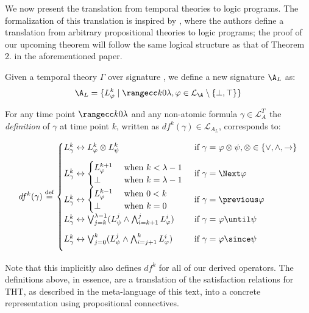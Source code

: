 We now present the translation from temporal theories to logic
programs. The formalization of this translation is inspired by
\cite[p. 9]{capeva05a}, where the authors define a translation from
arbitrary propositional theories to logic programs; the proof of our
upcoming theorem will follow the same logical structure as that of
Theorem 2. in the aforementioned paper.


Given a temporal theory $\Gamma$ over signature \A, we
define a new signature $\A_L$ as:
$$
\A_L = \{ L_{\varphi}^k \mid \kinlambda, \varphi \in
\mathcal{L}_\A\setminus \{ \bot, \top \} \}
$$

For any time point $\kinlambda$ and any non-atomic formula $\gamma \in \mathcal{L}_A^T$ the \emph{definition} of $\gamma$ at time point $k$, written as $df^k(\gamma) \in \mathcal{L}_{A_L}$, corresponds to:

\begin{align*}
df^k(\gamma) \defeq \begin{cases}
  L^k_{\gamma} \leftrightarrow L_{\varphi}^k \otimes L_{\psi}^k 
  &\text{ if } \gamma = \varphi \otimes \psi, \otimes \in \{ \vee, \wedge, \rightarrow \}\\[2ex]
  L^k_\gamma \leftrightarrow \begin{cases} 
    L^{k+1}_{\varphi} &\text{ when } k < \lambda - 1\\
    \bot &\text{ when } k = \lambda - 1
    \end{cases}
  &\text{ if } \gamma = \Next \varphi \\[2ex]
  L^k_{\gamma} \leftrightarrow \begin{cases} 
    L^{k-1}_{\varphi} &\text{ when } 0 < k\\
    \bot &\text{ when } k = 0
    \end{cases}
  &\text{ if } \gamma = \previous \varphi \\[2ex]
  L^k_{\gamma} \leftrightarrow \bigvee_{j=k}^{\lambda-1}(L_\psi^j \wedge \bigwedge_{i=k+1}^{j}L_{\varphi}^i)
  &\text{ if } \gamma = \varphi \until \psi \\[2ex]
  L^k_{\gamma} \leftrightarrow \bigvee_{j=0}^{k}(L_\psi^j \wedge \bigwedge_{i=j+1}^{k}L_{\varphi}^i)
  &\text{ if } \gamma = \varphi \since \psi \\[2ex]
\end{cases}
\end{align*}

Note that this implicitly also defines $df^k$ for all of our derived
operators. The definitions above, in essence, are a translation of the
satisfaction relations for THT, as described in the meta-language of
this text, into a concrete representation using propositional
connectives.

